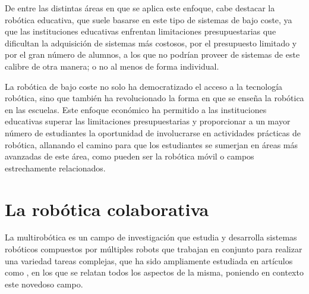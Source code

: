 De entre las distintas áreas en que se aplica este enfoque, cabe destacar la
robótica educativa, que suele basarse en este tipo de sistemas de bajo coste, ya
que las instituciones educativas enfrentan limitaciones presupuestarias que
dificultan la adquisición de sistemas más costosos, por el presupuesto limitado
y por el gran número de alumnos, a los que no podrían proveer de sistemas de
este calibre de otra manera; o no al menos de forma individual.

La robótica de bajo coste no solo ha democratizado el acceso a la tecnología
robótica, sino que también ha revolucionado la forma en que se enseña la
robótica en las escuelas.
Este enfoque económico ha permitido a las instituciones educativas superar las
limitaciones presupuestarias y proporcionar a un mayor número de estudiantes la
oportunidad de involucrarse en actividades prácticas de robótica, allanando el
camino para que los estudiantes se sumerjan en áreas más avanzadas de este área,
como pueden ser la robótica móvil o campos estrechamente relacionados.



\section{La robótica colaborativa}
\label{sec:robotica_colaborativa} %


La multirobótica es un campo de investigación que estudia y desarrolla sistemas
robóticos compuestos por múltiples robots que trabajan en conjunto para realizar
una variedad tareas complejas, que ha sido ampliamente estudiada en artículos
como \cite{Verma2021}, en los que se relatan todos los aspectos de la misma,
poniendo en contexto este novedoso campo.

